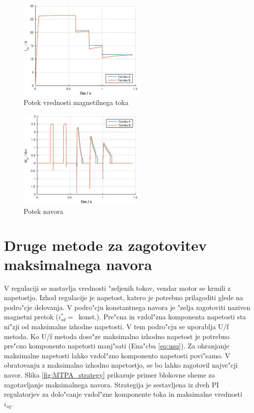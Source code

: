 \documentclass[journal,a4paper,twoside]{sty/IEEEtran}
\begin{document}
\begin{figure}
\includegraphics[width=0.55\textwidth]{fig_imr.eps}
\caption{Potek vrednosti magnetilnega toka}
\label{fig:imr}
\end{figure}



\begin{figure}
\includegraphics[width=0.55\textwidth]{fig_Mel.eps}
\caption{Potek navora}
\label{fig:Mel}
\end{figure}

\section{Druge metode za zagotovitev maksimalnega navora}

V regulaciji se nastavlja vrednosti "zeljenih tokov, vendar motor se krmili z napetostjo. Izhod regulacije je napetost, katero je potrebno prilagoditi glede na  podro"cje delovanja. V podro"cju konstantnega navora je "zelja zagotoviti naziven magnetni pretok ($i_{sd}^*=$~konst.).
Pre"cna in vzdol"zna komponenta napetosti sta ni"zji od maksimalne izhodne napetosti. V tem podro"cju se uporablja U/f metoda. \cite{servopogoni} Ko U/f metoda dose"ze maksimalno izhodno napetost je potrebno pre"cno komponento napetosti manj"sati (Ena"cba \ref{eq:usq}). Za ohranjanje maksimalne napetosti lahko vzdol"zno komponento napetosti povi"samo. V obratovanju z maksimalno izhodno napetostjo, se bo lahko zagotovil najve"cji navor. Slika \ref{fig:MTPA_strategy} prikazuje primer blokovne sheme za zagotavljanje maksimalnega navora. Strategija je sestavljena iz dveh PI regulatorjev za dolo"canje vzdol"zne komponente toka in maksimalne vrednosti $i_{sq}$.
\end{document}
